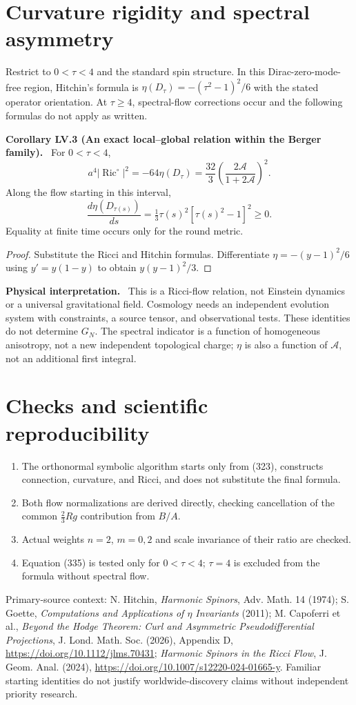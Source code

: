\documentclass[11pt,a4paper,oneside]{book}
\newcommand{\statement}[3]{\par\medskip\noindent\textbf{#1 #2 (#3).}\ }
\newcommand{\note}[1]{\par\medskip\noindent\textbf{#1}\ }
\begin{document}
\section{Curvature rigidity and spectral asymmetry}
Restrict to $0<\tau<4$ and the standard spin structure. In this Dirac-zero-mode-free region, Hitchin's formula is $\eta(D_\tau)=-(\tau^2-1)^2/6$ with the stated operator orientation. At $\tau\ge4$, spectral-flow corrections occur and the following formulas do not apply as written.
\statement{Corollary}{LV.3}{An exact local--global relation within the Berger family}
For $0<\tau<4$,
\begin{equation}a^4|\operatorname{Ric}^{\circ}|^2=-64\eta(D_\tau)=\frac{32}3\left(\frac{2\mathcal A}{1+2\mathcal A}\right)^2.\tag{335}\end{equation}
Along the flow starting in this interval,
\begin{equation}\frac{d\eta(D_{\tau(s)})}{ds}=\tfrac13\tau(s)^2[\tau(s)^2-1]^2\ge0.\tag{336}\end{equation}
Equality at finite time occurs only for the round metric.
\begin{proof}
Substitute the Ricci and Hitchin formulas. Differentiate $\eta=-(y-1)^2/6$ using $y'=y(1-y)$ to obtain $y(y-1)^2/3$.
\end{proof}
\note{Physical interpretation.} This is a Ricci-flow relation, not Einstein dynamics or a universal gravitational field. Cosmology needs an independent evolution system with constraints, a source tensor, and observational tests. These identities do not determine $G_N$. The spectral indicator is a function of homogeneous anisotropy, not a new independent topological charge; $\eta$ is also a function of $\mathcal A$, not an additional first integral.
\section{Checks and scientific reproducibility}
\begin{enumerate}
\item The orthonormal symbolic algorithm starts only from (323), constructs connection, curvature, and Ricci, and does not substitute the final formula.
\item Both flow normalizations are derived directly, checking cancellation of the common $\tfrac23Rg$ contribution from $B/A$.
\item Actual weights $n=2$, $m=0,2$ and scale invariance of their ratio are checked.
\item Equation (335) is tested only for $0<\tau<4$; $\tau=4$ is excluded from the formula without spectral flow.
\end{enumerate}
Primary-source context: N. Hitchin, \emph{Harmonic Spinors}, Adv. Math. 14 (1974); S. Goette, \emph{Computations and Applications of $\eta$ Invariants} (2011); M. Capoferri et al., \emph{Beyond the Hodge Theorem: Curl and Asymmetric Pseudodifferential Projections}, J. Lond. Math. Soc. (2026), Appendix D, \url{https://doi.org/10.1112/jlms.70431}; \emph{Harmonic Spinors in the Ricci Flow}, J. Geom. Anal. (2024), \url{https://doi.org/10.1007/s12220-024-01665-y}. Familiar starting identities do not justify worldwide-discovery claims without independent priority research.
\end{document}
